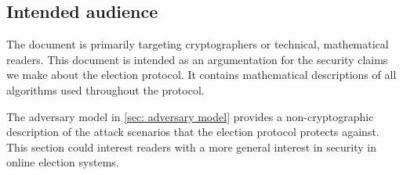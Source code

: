 \subsection{Intended audience}
The document is primarily targeting cryptographers or technical, mathematical readers. This document is intended as an argumentation for the security claims we make about the election protocol. It contains mathematical descriptions of all algorithms used throughout the protocol.

The adversary model in \cref{sec: adversary model} provides a non-cryptographic description of the attack scenarios that the election protocol protects against. This section could interest readers with a more general interest in security in online election systems.
